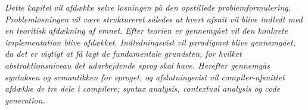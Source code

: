 \textit{Dette kapitel vil afdække selve løsningen på den opstillede problemformulering. Problemløsningen vil være struktureret således at hvert afsnit vil blive indledt med en teoritisk afdækning af emnet. Efter teorien er gennemgået vil den konkrete implementation blive afdækket. Indledningsvist vil paradigmet blive gennemgået, da det er vigtigt at få lagt de fundamentale grundsten, for hvilket abstraktionsniveau det udarbejdende sprog skal have. Herefter gennemgås syntaksen og semantikken for sproget, og afslutningsvist vil compiler-afsnittet afdække de tre dele i compilere; syntax analysis, contextual analysis og code generation.}